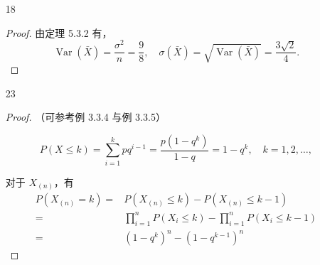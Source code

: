 \documentclass[normal,founder,mtpro2,cn]{elegantnote}
\begin{document}
\begin{enumerate}
\begin{proof}
            同理，我们有
            \begin{equation*}
                \operatorname{Var}\left(X_{j}-\bar{X}\right)=\frac{n-1}{n} \sigma^{2};
            \end{equation*}
    
            所以，
            \begin{equation*}
                \begin{aligned}
                    \operatorname{Corr}\left(X_{i}-\bar{X},X_{j}-\bar{X}\right)=&\frac{\operatorname{Cov}\left(X_{i}-\bar{X},X_{j}-\bar{X}\right)}{\sqrt{\operatorname{Var}\left(X_{i}-\bar{X}\right)}\cdot\sqrt{\operatorname{Var}\left(X_{j}-\bar{X}\right)}} \\
                    =&\frac{-\frac{1}{n}\sigma^{2}}{\sqrt{\frac{n-1}{n}\sigma^{2}}\cdot\sqrt{\frac{n-1}{n}\sigma^{2}}}=-\frac{1}{n-1} \\
                \end{aligned}
            \end{equation*}
        \end{proof}
        
        \item[18] 
        \begin{proof}
            由定理 5.3.2 有，
            \begin{equation*}
                \operatorname{Var}(\bar{X})=\frac{\sigma^2}{n}=\frac{9}{8},\quad \sigma(\bar{X})=\sqrt{\operatorname{Var}(\bar{X})}=\frac{3\sqrt{2}}{4}.
            \end{equation*}
        \end{proof}
    
        \item[23] 
        \begin{proof}
            （可参考例 3.3.4 与例 3.3.5） 

            \begin{equation*}
                P\left(X\leq k\right)=\sum_{i=1}^{k}pq^{i-1}=\frac{p\left(1-q^{k}\right)}{1-q}=1-q^{k},\quad k=1,2,\ldots,
            \end{equation*}

            对于 $X_{(n)}$，有
            \begin{equation*}
                \begin{aligned}
                    P\left(X_{(n)}=k\right)=&P\left(X_{(n)}\leq k\right)-P\left(X_{(n)}\leq k-1\right) \\
                    =&\prod_{i=1}^{n}P\left(X_{i}\leq k\right)-\prod_{i=1}^{n}P\left(X_{i}\leq k-1\right) \\
                    =&\left(1-q^{k}\right)^{n}-\left(1-q^{k-1}\right)^{n}
                \end{aligned}
            \end{equation*}


\end{proof}
\end{enumerate}
\end{document}
